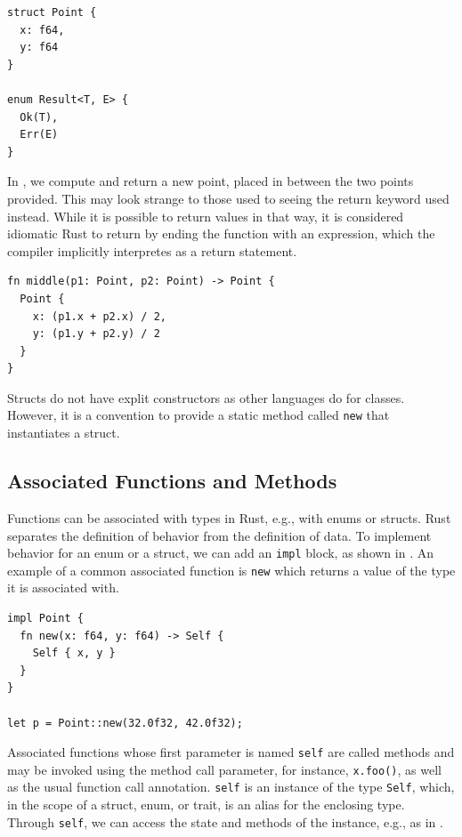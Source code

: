 \documentclass[paper=a4,%
  twoside,%
  BCOR4mm,%
  abstract=true,%
  toc=bibliography,%
  chapterprefix=true,%
  toc=bibliographynumbered,%
  open=right,%
  english,%
  pagesize=pdftex]{scrreprt}
\begin{document}
\begin{lstlisting}[style=boxed, caption={The type definition for a point in two-dimensional space and an enum definition}, label=lst:example-struct-enum]
struct Point {
  x: f64,
  y: f64
}

enum Result<T, E> {
  Ok(T),
  Err(E)
}
\end{lstlisting}

In , we compute and return a new point, placed in between the two points provided. This may look strange to those used to seeing the return keyword used instead. While it is possible to return values in that way, it is considered idiomatic Rust to return by ending the function with an expression, which the compiler implicitly interpretes as a return statement.

\begin{lstlisting}[style=boxed, caption={A function to compute the point between two points in two-dimensional space}, label=lst:example-functions-struct-enum]
fn middle(p1: Point, p2: Point) -> Point {
  Point {
    x: (p1.x + p2.x) / 2,
    y: (p1.y + p2.y) / 2
  }
}
\end{lstlisting}

Structs do not have explit constructors as other languages do for classes. However, it is a convention to provide a static method called \texttt{new} that instantiates a struct.

\subsection{Associated Functions and Methods}
Functions can be associated with types in Rust, e.g., with enums or structs. Rust separates the definition of behavior from the definition of data. To implement behavior for an enum or a struct, we can add an \texttt{impl} block, as shown in . An example of a common associated function is \texttt{new} which returns a value of the type it is associated with.

\begin{lstlisting}[style=boxed, caption={Associating behavior with the \texttt{Point} data type defined in \Cref{lst:example-struct-enum}}, label=lst:example-associated-function]
impl Point {
  fn new(x: f64, y: f64) -> Self {
    Self { x, y }
  }
}

let p = Point::new(32.0f32, 42.0f32);
\end{lstlisting}

Associated functions whose first parameter is named \texttt{self} are called methods and may be invoked using the method call parameter, for instance, \texttt{x.foo()}, as well as the usual function call annotation. \texttt{self} is an instance of the type \texttt{Self}, which, in the scope of a struct, enum, or trait, is an alias for the enclosing type. Through \texttt{self}, we can access the state and methods of the instance, e.g., as in .
\end{document}
